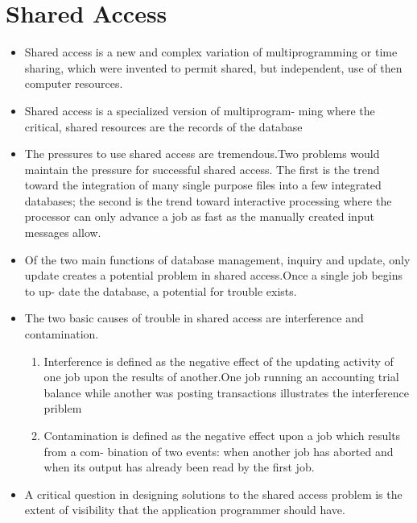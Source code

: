 \documentclass[a4paper]{article}
\begin{document}
\section{Shared Access}
\begin{itemize}
\item Shared access is a new and complex variation of
multiprogramming or time sharing, which were invented to permit shared, but independent, use of then computer resources.
\item Shared access is a specialized version of multiprogram-
ming where the critical, shared resources are the records
of the database
\item The pressures to use shared access are tremendous.Two problems would maintain the pressure for successful shared access. The first is the trend toward the integration of many single purpose files into a few integrated databases; the second is the trend toward interactive processing where the processor can only advance a job as fast as the manually created input messages allow.
\item Of the two main functions of database management,
inquiry and update, only update creates a potential
problem in shared access.Once a single job begins to up-
date the database, a potential for trouble exists.
\item The two basic causes of trouble in shared access are
interference and contamination.
\begin{enumerate}
\item Interference is defined as the negative effect of the updating activity of one job upon the results of another.One job running an accounting trial balance while another was posting transactions illustrates the interference priblem
\item Contamination is defined as
the negative effect upon a job which results from a com-
bination of two events: when another job has aborted
and when its output has already been read by the first job.
\end{enumerate}
\item A critical question in designing solutions to the
shared access problem is the extent of visibility that the
application programmer should have.
\end{itemize}
\end{document}

